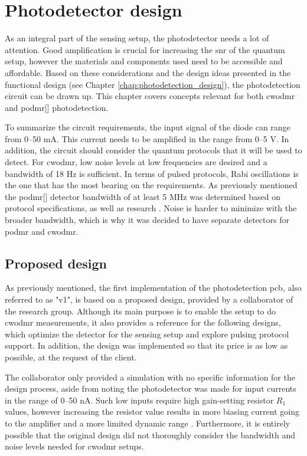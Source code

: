\chapter{Photodetector design}
As an integral part of the sensing setup, the photodetector needs a lot of attention. Good amplification is crucial for increasing the \gls{snr} of the quantum setup, however the materials and components used need to be accessible and affordable. Based on these considerations and the design ideas presented in the functional design (see Chapter \ref{chap:photodetection_design}), the photodetection circuit can be drawn up. This chapter covers concepts relevant for both \gls{cwodmr} and \gls{podmr}[] photodetection. 

To summarize the circuit requirements, the input signal of the diode can range from \numrange{0}{50} \unit{\milli\ampere}. This current needs to be amplified in the range from \numrange{0}{5} \unit{\volt}. In addition, the circuit should consider the quantum protocols that it will be used to detect. For \gls{cwodmr}, low noise levels at low frequencies are desired and a bandwidth of 18 \unit{\hertz} is sufficient. In terms of pulsed protocols, Rabi oscillations is the one that has the most bearing on the requirements. As previously mentioned the \gls{podmr}[] detector bandwidth of at least 5 \unit{\mega\hertz} was determined based on protocol specifications, as well as research \cite{sewani2020coherent, nandi2024oscilloscope, murzakhanov2025mechanism}. Noise is harder to minimize with the broader bandwidth, which is why it was decided to have separate detectors for \gls{podmr} and \gls{cwodmr}.

\section{Proposed design}\label{chap:td:prop_design}
As previously mentioned, the first implementation of the photodetection \gls{pcb}, also referred to as "v1", is based on a proposed design, provided by a collaborator of the research group. Although its main purpose is to enable the setup to do \gls{cwodmr} measurements, it also provides a reference for the following designs, which optimize the detector for the sensing setup and explore pulsing protocol support. In addition, the design was implemented so that its price is as low as possible, at the request of the client.

The collaborator only provided a simulation with no specific information for the design process, aside from noting the photodetector was made for input currents in the range of \numrange{0}{50} \unit{\nano\ampere}. Such low inputs require high gain-setting resistor $R_1$ values, however increasing the resistor value results in more biasing current going to the amplifier and a more limited dynamic range \cite{black2021tia}. Furthermore, it is entirely possible that the original design did not thoroughly consider the bandwidth and noise levels needed for \gls{cwodmr} setups. 

